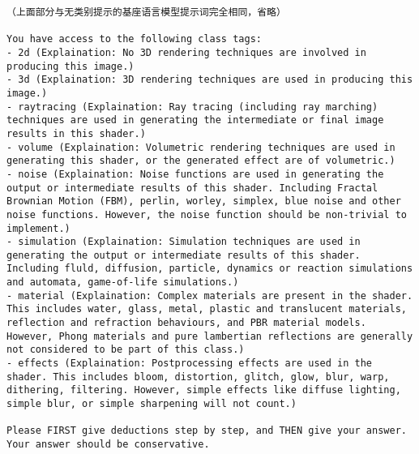     
\begin{lstlisting}[style=plaintext, caption={有详细类别提示的基座语言模型提示词}, label=lst:detailedPromptPrompt]
（上面部分与无类别提示的基座语言模型提示词完全相同，省略）

You have access to the following class tags:
- 2d (Explaination: No 3D rendering techniques are involved in producing this image.)
- 3d (Explaination: 3D rendering techniques are used in producing this image.)
- raytracing (Explaination: Ray tracing (including ray marching) techniques are used in generating the intermediate or final image results in this shader.)
- volume (Explaination: Volumetric rendering techniques are used in generating this shader, or the generated effect are of volumetric.)
- noise (Explaination: Noise functions are used in generating the output or intermediate results of this shader. Including Fractal Brownian Motion (FBM), perlin, worley, simplex, blue noise and other noise functions. However, the noise function should be non-trivial to implement.)
- simulation (Explaination: Simulation techniques are used in generating the output or intermediate results of this shader. Including fluld, diffusion, particle, dynamics or reaction simulations and automata, game-of-life simulations.)
- material (Explaination: Complex materials are present in the shader. This includes water, glass, metal, plastic and translucent materials, reflection and refraction behaviours, and PBR material models. However, Phong materials and pure lambertian reflections are generally not considered to be part of this class.)
- effects (Explaination: Postprocessing effects are used in the shader. This includes bloom, distortion, glitch, glow, blur, warp, dithering, filtering. However, simple effects like diffuse lighting, simple blur, or simple sharpening will not count.)

Please FIRST give deductions step by step, and THEN give your answer. Your answer should be conservative.
\end{lstlisting}
